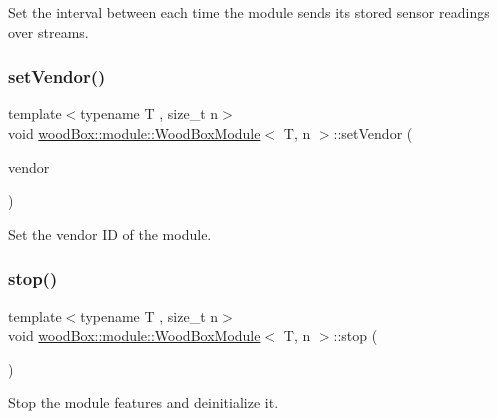 Set the interval between each time the module sends its stored sensor readings over streams. \mbox{\label{classwood_box_1_1module_1_1_wood_box_module_af19696ed5702e009a584065892ed1501}} 
\subsubsection{\texorpdfstring{set\+Vendor()}{setVendor()}}
{\footnotesize\ttfamily template$<$typename T , size\+\_\+t n$>$ \\
void \mbox{\hyperlink{classwood_box_1_1module_1_1_wood_box_module}{wood\+Box\+::module\+::\+Wood\+Box\+Module}}$<$ T, n $>$\+::set\+Vendor (\begin{DoxyParamCaption}\item[{const \mbox{\hyperlink{classwood_box_1_1module_1_1_wood_box_module_adf5d59bae2980ff138284d0fa885df19}{module\+Vendor}} \&}]{vendor }\end{DoxyParamCaption})\hspace{0.3cm}{\ttfamily [inline]}}

Set the vendor ID of the module. \mbox{\label{classwood_box_1_1module_1_1_wood_box_module_abbc32e89fe1ace40f447539237c0b713}} 
\subsubsection{\texorpdfstring{stop()}{stop()}}
{\footnotesize\ttfamily template$<$typename T , size\+\_\+t n$>$ \\
void \mbox{\hyperlink{classwood_box_1_1module_1_1_wood_box_module}{wood\+Box\+::module\+::\+Wood\+Box\+Module}}$<$ T, n $>$\+::stop (\begin{DoxyParamCaption}{ }\end{DoxyParamCaption})\hspace{0.3cm}{\ttfamily [inline]}}

Stop the module features and deinitialize it. \mbox{\label{classwood_box_1_1module_1_1_wood_box_module_a4fa136e3e3f29c71d12a8163b4c5a765}} 
